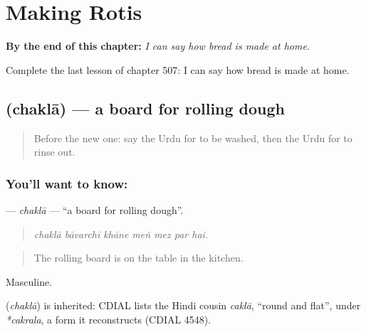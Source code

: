 
\chapter{Making Rotis}
\label{ch:ur-making-rotis}

\begin{chapteropening}
\textbf{By the end of this chapter:} \emph{I can say how bread is made at home.}

Complete the last lesson of chapter 507: I can say how bread is made at home.
\end{chapteropening}

\section[\texorpdfstring{\ur{چکلا} (chaklā)}{چکلا (chaklā)}]{ (chaklā) — a board for rolling dough}

\label{lesson:UR-C507-chakla}



\begin{quote}
Before the new one: say the Urdu for to be washed, then the Urdu for to rinse out.
\end{quote}

\subsection*{You'll want to know: }
\textbf{} — \emph{chaklā} — \textquotedblleft{}a board for rolling dough\textquotedblright{}.

\begin{quote}
      
\end{quote}

\begin{quote}
\emph{chaklā bāvarchī khāne meṅ mez par hai.}
\end{quote}

\begin{quote}
The rolling board is on the table in the kitchen.
\end{quote}

Masculine.

\begin{cousinweb}
\textbf{} (\emph{chaklā}) is inherited: CDIAL lists the Hindi cousin \emph{caklā}, \textquotedblleft{}round and flat\textquotedblright{}, under \emph{*cakrala}, a form it reconstructs (CDIAL 4548).
\end{cousinweb}

